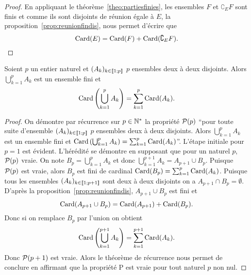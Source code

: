 \begin{proof}
  En appliquant le théorème~\ref{theo:partiesfinies}, les ensembles \(F\) et 
  \(\complement_E F\) sont finis et comme ils sont disjoints de réunion égale à 
  \(E\), la proposition~\ref{prop:reunionfindis}, nous permet d'écrire que
  \begin{equation}
    \Card(E) = \Card(F) + \Card(\complement_E F).
  \end{equation}
\end{proof}

\begin{prop}
  Soient \(p\) un entier naturel et \((A_k)_{k\in\intervalleentier{1}{p}}\) 
  \(p\) ensembles deux à deux disjoints. Alors \(\bigcup_{k = 1}^{p}A_k\) est un 
  ensemble fini et
  \begin{equation}
    \Card\left(\bigcup_{k = 1}^{p}A_k\right) = \sum_{k = 1}^{p}\Card(A_k).
  \end{equation}
\end{prop}

\begin{proof}
  On démontre par récurrence sur \(p\in \N^*\) la propriété \(\P(p)\) ``pour 
  toute suite d'ensemble \((A_k)_{k\in\intervalleentier{1}{p}}\) \(p\) ensembles 
  deux à deux disjoints. Alors \(\bigcup_{k = 1}^{p}A_k\) est un ensemble fini 
  et \(\Card\left(\bigcup_{k = 1}^{p}A_k\right) = \sum_{k = 
  1}^{p}\Card(A_k)\)''. L'étape initiale pour \(p = 1\) est évident. L'hérédité 
  se démontre en supposant que pour un naturel \(p\), \(\P(p)\) vraie. On note 
  \(B_p = \bigcup_{k = 1}^{p}A_k\) et donc \(\bigcup_{k = 1}^{p + 1}A_k = A_{p + 
  1}\cup B_p\). Puisque \(\P(p)\) est vraie, alors \(B_p\) est fini de cardinal 
  \(\Card(B_p) = \sum_{k = 1}^{p}\Card(A_k)\). Puisque tous les ensembles 
  \((A_k)_{k\in\intervalleentier{1}{p + 1}}\) sont deux à deux disjoints on a 
  \(A_{p + 1}\cap B_p = \emptyset\). D'après la 
  proposition~\ref{prop:reunionfindis}, \(A_{p + 1}\cup B_p\) est fini et
  \begin{equation}
    \Card(A_{p + 1}\cup B_p) = \Card(A_{p + 1}) + \Card(B_p).
  \end{equation}
  Donc si on remplace \(B_p\) par l'union on obtient
  \begin{equation}
    \Card\left(\bigcup_{k = 1}^{p + 1}A_k\right) = \sum_{k = 1}^{p + 
    1}\Card(A_k).
  \end{equation}
  Donc \(\P(p + 1)\) est vraie. Alors le théorème de récurrence nous permet de 
  conclure en affirmant que la propriété P est vraie pour tout naturel \(p\) non 
  nul.
\end{proof}

